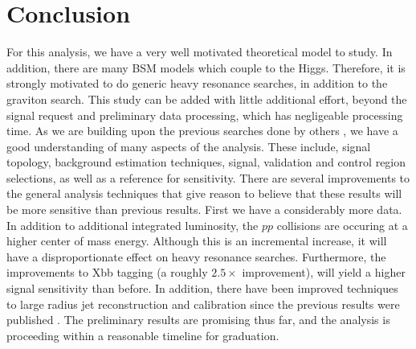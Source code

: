 \documentclass[12pt]{article}
\begin{document}
\section{Conclusion}
For this analysis, we have a very well motivated theoretical model to study. In
addition, there are many BSM models which couple to the Higgs. Therefore, it is
strongly motivated to do generic heavy resonance searches, in addition to the
graviton search. This study can be added with little additional effort, beyond
the signal request and preliminary data processing, which has negligeable
processing time. As we are building upon the previous searches done by others
\cite{atlas_resonant_2022}, we have a good understanding of many aspects of the
analysis. These include, signal topology, background estimation techniques,
signal, validation and control region selections, as well as a reference for
sensitivity. There are several improvements to the general analysis techniques
that give reason to believe that these results will be more sensitive than
previous results. First we have a considerably more data. In addition to
additional integrated luminosity, the $pp$ collisions are occuring at a higher
center of mass energy. Although this is an incremental increase, it will have a
disproportionate effect on heavy resonance searches. Furthermore, the
improvements to Xbb tagging (a roughly $2.5\times$ improvement), will yield a
higher signal sensitivity than before. In addition, there have been improved
techniques to large radius jet reconstruction and calibration since the previous
results were published \cite{large_r_jet}. The preliminary results are promising
thus far, and the analysis is proceeding within a reasonable timeline for
graduation.

\newpage


\end{document}
